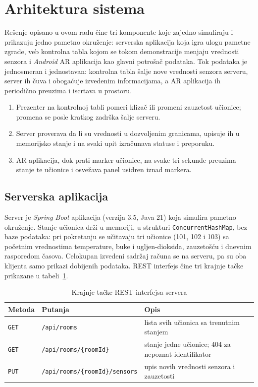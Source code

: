 \section{Arhitektura sistema}

Rešenje opisano u ovom radu čine tri komponente koje zajedno simuliraju i prikazuju jedno pametno okruženje: serverska aplikacija koja igra ulogu pametne zgrade, veb kontrolna tabla kojom se tokom demonstracije menjaju vrednosti senzora i \textit{Android} AR aplikacija kao glavni potrošač podataka. Tok podataka je jednosmeran i jednostavan: kontrolna tabla šalje nove vrednosti senzora serveru, server ih čuva i obogaćuje izvedenim informacijama, a AR aplikacija ih periodično preuzima i iscrtava u prostoru.

\begin{enumerate}
\item Prezenter na kontrolnoj tabli pomeri klizač ili promeni zauzetost učionice; promena se posle kratkog zadrška šalje serveru.
\item Server proverava da li su vrednosti u dozvoljenim granicama, upisuje ih u memorijsko stanje i na svaki upit izračunava statuse i preporuku.
\item AR aplikacija, dok prati marker učionice, na svake tri sekunde preuzima stanje te učionice i osvežava panel usidren iznad markera.
\end{enumerate}

\subsection{Serverska aplikacija}

Server je \textit{Spring Boot} aplikacija (verzija 3.5, Java 21) koja simulira pametno okruženje. Stanje učionica drži u memoriji, u strukturi \texttt{ConcurrentHashMap}, bez baze podataka: pri pokretanju se učitavaju tri učionice (101, 102 i 103) sa početnim vrednostima temperature, buke i ugljen-dioksida, zauzetošću i dnevnim rasporedom časova. Celokupan izvedeni sadržaj računa se na serveru, pa su oba klijenta samo prikazi dobijenih podataka. REST interfejs čine tri krajnje tačke prikazane u tabeli~\ref{tab:endpoints}.

\begin{table}[H]
\centering
\small
\begin{tabular}{llp{5.6cm}}
\toprule
\textbf{Metoda} & \textbf{Putanja} & \textbf{Opis} \\
\midrule
\texttt{GET} & \texttt{/api/rooms} & lista svih učionica sa trenutnim stanjem \\
\texttt{GET} & \texttt{/api/rooms/\{roomId\}} & stanje jedne učionice; 404 za nepoznat identifikator \\
\texttt{PUT} & \texttt{/api/rooms/\{roomId\}/sensors} & upis novih vrednosti senzora i zauzetosti \\
\bottomrule
\end{tabular}
\caption{Krajnje tačke REST interfejsa servera}
\label{tab:endpoints}
\end{table}

